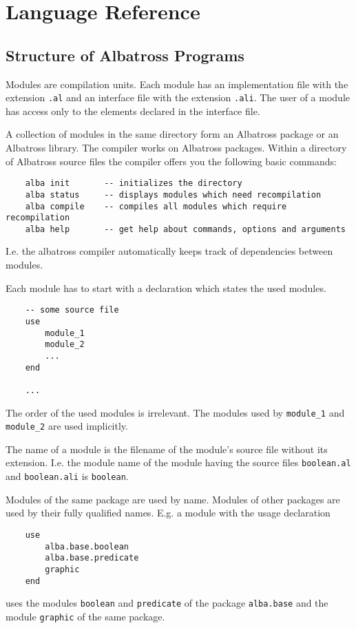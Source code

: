 \chapter{Language Reference}

\section{Structure of Albatross Programs}

Modules are compilation units. Each module has an implementation file with the
extension \lstinline!.al! and an interface file with the extension
\lstinline!.ali!. The user of a module has access only to the elements
declared in the interface file.

A collection of modules in the same directory form an Albatross package or an
Albatross library. The compiler works on Albatross packages. Within a
directory of Albatross source files the compiler offers you the following
basic commands:

\begin{lstlisting}
    alba init       -- initializes the directory
    alba status     -- displays modules which need recompilation
    alba compile    -- compiles all modules which require recompilation
    alba help       -- get help about commands, options and arguments
\end{lstlisting}
  
I.e. the albatross compiler automatically keeps track of dependencies between
modules.

Each module has to start with a declaration which states the used modules.

\begin{lstlisting}
    -- some source file
    use
        module_1
        module_2
        ...
    end
    
    ...
\end{lstlisting}

The order of the used modules is irrelevant. The modules used by \lstinline!module_1!
and \lstinline!module_2! are used implicitly.

The name of a module is the filename of the module's source file without its
extension. I.e. the module name of the module having the source files
\lstinline!boolean.al! and \lstinline!boolean.ali! is \lstinline!boolean!.

Modules of the same package are used by name. Modules of other packages are
used by their fully qualified names. E.g. a module with the usage declaration
\begin{lstlisting}
    use
        alba.base.boolean
        alba.base.predicate
        graphic
    end
\end{lstlisting}
uses the modules \lstinline!boolean! and \lstinline!predicate! of the package
\lstinline!alba.base! and the module \lstinline!graphic! of the same package.

